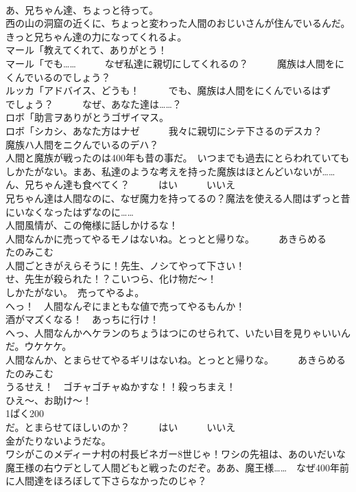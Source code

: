 \documentclass[8pt]{extreport}
\begin{document}
\begin{CJK}{UTF8}{min}
\\	あ、兄ちゃん達、ちょっと待って。	
\\	西の山の洞窟の近くに、ちょっと変わった人間のおじいさんが住んでいるんだ。きっと兄ちゃん達の力になってくれるよ。	
\\	マール「教えてくれて、ありがとう！	
\\	マール「でも……　　　なぜ私達に親切にしてくれるの？　　　魔族は人間をにくんでいるのでしょう？	
\\	ルッカ「アドバイス、どうも！　　　でも、魔族は人間をにくんでいるはず　　　でしょう？　　　なぜ、あなた達は……？	
\\	ロボ「助言ヲありがとうゴザイマス。	
\\	ロボ「シカシ、あなた方はナゼ　　　我々に親切にシテ下さるのデスカ？　　　魔族ハ人間をニクんでいるのデハ？	
\\	人間と魔族が戦ったのは400年も昔の事だ。　いつまでも過去にとらわれていてもしかたがない。まあ、私達のような考えを持った魔族はほとんどいないが……	
\\	ん、兄ちゃん達も食べてく？　　　はい　　　いいえ	
\\	兄ちゃん達は人間なのに、なぜ魔力を持ってるの？魔法を使える人間はずっと昔にいなくなったはずなのに……	
\\	人間風情が、この俺様に話しかけるな！	
\\	人間なんかに売ってやるモノはないね。とっとと帰りな。　　　あきらめる　　　たのみこむ	
\\	人間ごときがえらそうに！先生、ノシてやって下さい！	
\\	せ、先生が殺られた！？こいつら、化け物だ～！	
\\	しかたがない。　売ってやるよ。	
\\	へっ！　人間なんぞにまともな値で売ってやるもんか！	
\\	酒がマズくなる！　あっちに行け！	
\\	へっ、人間なんかヘケランのちょうはつにのせられて、いたい目を見りゃいいんだ。ウケケケ。	
\\	人間なんか、とまらせてやるギリはないね。とっとと帰りな。　　　あきらめる　　　たのみこむ	
\\	うるせえ！　ゴチャゴチャぬかすな！！殺っちまえ！	
\\	ひえ～、お助け～！	
\\	1ぱく200
\\	だ。とまらせてほしいのか？　　　はい　　　いいえ	
\\	金がたりないようだな。	
\\	ワシがこのメディーナ村の村長ビネガー8世じゃ！ワシの先祖は、あのいだいな魔王様の右ウデとして人間どもと戦ったのだぞ。ああ、魔王様……　なぜ400年前に人間達をほろぼして下さらなかったのじゃ？	

\end{CJK}
\end{document}
